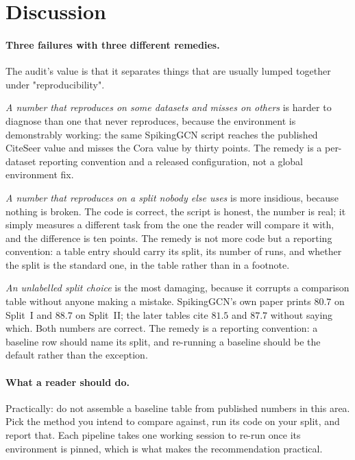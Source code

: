 \section{Discussion}
\label{sec:discussion}

\paragraph{Three failures with three different remedies.} The audit's value is that it separates
things that are usually lumped together under "reproducibility".

\emph{A number that reproduces on some datasets and misses on others} is harder to diagnose than one
that never reproduces, because the environment is demonstrably working: the same SpikingGCN script
reaches the published CiteSeer value and misses the Cora value by thirty points. The remedy is a
per-dataset reporting convention and a released configuration, not a global environment fix.

\emph{A number that reproduces on a split nobody else uses} is more insidious, because nothing is
broken. The code is correct, the script is honest, the number is real; it simply measures a different
task from the one the reader will compare it with, and the difference is ten points. The remedy is not
more code but a reporting convention: a table entry should carry its split, its number of runs, and
whether the split is the standard one, in the table rather than in a footnote.

\emph{An unlabelled split choice} is the most damaging, because it corrupts a comparison table
without anyone making a mistake. SpikingGCN's own paper prints $80.7$ on Split~I and $88.7$ on
Split~II; the later tables cite $81.5$ and $87.7$ without saying which. Both numbers are correct.
The remedy is a reporting convention: a baseline row should name its split, and re-running a baseline
should be the default rather than the exception.

\paragraph{What a reader should do.} Practically: do not assemble a baseline table from published
numbers in this area. Pick the method you intend to compare against, run its code on your split, and
report that. Each pipeline takes one working session to re-run once its environment is pinned,
which is what makes the recommendation practical.

